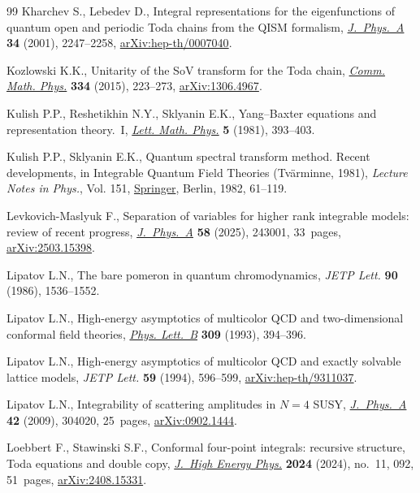 \documentclass[10pt,a4paper]{amsart}
\numberwithin{equation}{section}
\begin{document}
\begin{thebibliography}{99}
Kharchev S., Lebedev D., Integral representations for the eigenfunctions of
 quantum open and periodic {T}oda chains from the {QISM} formalism,
 \href{https://doi.org/10.1088/0305-4470/34/11/317}{\textit{J.~Phys.~A}}
 \textbf{34} (2001), 2247--2258,
 \href{http://arxiv.org/abs/hep-th/0007040}{arXiv:hep-th/0007040}.

Kozlowski K.K., Unitarity of the {S}o{V} transform for the {T}oda chain,
 \href{https://doi.org/10.1007/s00220-014-2134-6}{\textit{Comm. Math. Phys.}}
 \textbf{334} (2015), 223--273,
 \href{http://arxiv.org/abs/1306.4967}{arXiv:1306.4967}.

Kulish P.P., Reshetikhin N.Y., Sklyanin E.K., {Y}ang--{B}axter equations and
 representation theory.~{I},
 \href{https://doi.org/10.1007/BF02285311}{\textit{Lett. Math. Phys.}}
 \textbf{5} (1981), 393--403.

Kulish P.P., Sklyanin E.K., Quantum spectral transform method. {R}ecent
 developments, in Integrable Quantum Field Theories ({T}v\"arminne, 1981),
 \textit{Lecture Notes in Phys.}, Vol. 151,
 \href{https://doi.org/10.1007/3-540-11190-5_8}{Springer}, Berlin, 1982,
 61--119.

Levkovich-Maslyuk F., Separation of variables for higher rank integrable
 models: review of recent progress,
 \href{https://doi.org/10.1088/1751-8121/ade103}{\textit{J.~Phys.~A}}
 \textbf{58} (2025), 243001, 33~pages,
 \href{http://arxiv.org/abs/2503.15398}{arXiv:2503.15398}.

Lipatov L.N., The bare pomeron in quantum chromodynamics, \textit{JETP Lett.}
 \textbf{90} (1986), 1536--1552.

Lipatov L.N., High-energy asymptotics of multicolor {QCD} and two-dimensional
 conformal field theories,
 \href{https://doi.org/10.1016/0370-2693(93)90951-D}{\textit{Phys. Lett.~B}}
 \textbf{309} (1993), 394--396.

Lipatov L.N., High-energy asymptotics of multicolor {QCD} and exactly solvable
 lattice models, \textit{JETP Lett.} \textbf{59} (1994), 596--599,
 \href{http://arxiv.org/abs/hep-th/9311037}{arXiv:hep-th/9311037}.

Lipatov L.N., Integrability of scattering amplitudes in {$N=4$} {SUSY},
 \href{https://doi.org/10.1088/1751-8113/42/30/304020}{\textit{J.~Phys.~A}}
 \textbf{42} (2009), 304020, 25~pages,
 \href{http://arxiv.org/abs/0902.1444}{arXiv:0902.1444}.

Loebbert F., Stawinski S.F., Conformal four-point integrals: recursive
 structure, {T}oda equations and double copy,
 \href{https://doi.org/10.1007/jhep11(2024)092}{\textit{J.~High Energy Phys.}}
 \textbf{2024} (2024), no.~11, 092, 51~pages,
 \href{http://arxiv.org/abs/2408.15331}{arXiv:2408.15331}.


\end{thebibliography}
\end{document}
